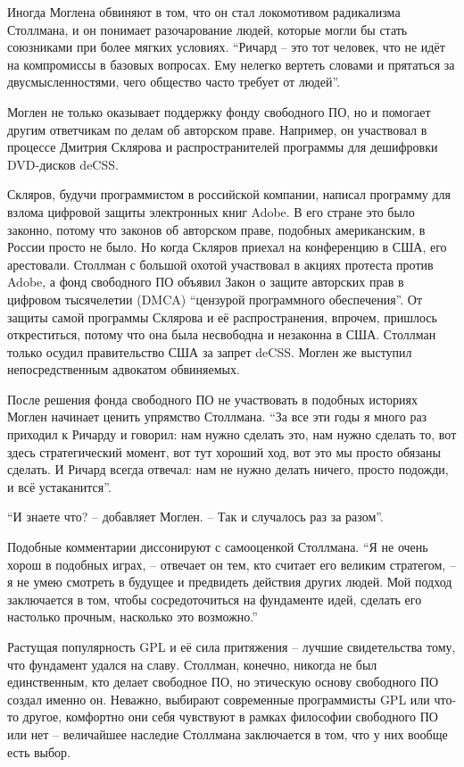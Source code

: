 Иногда Моглена обвиняют в том, что он стал локомотивом радикализма Столлмана, и он понимает разочарование людей, которые могли бы стать союзниками при более мягких условиях. \enquote{Ричард -- это тот человек, что не идёт на компромиссы в базовых вопросах. Ему нелегко вертеть словами и прятаться за двусмысленностями, чего общество часто требует от людей}.

Моглен не только оказывает поддержку фонду свободного ПО, но и помогает другим ответчикам по делам об авторском праве. Например, он участвовал в процессе Дмитрия Склярова и распространителей программы для дешифровки DVD-дисков deCSS.

Скляров, будучи программистом в российской компании, написал программу для взлома цифровой защиты электронных книг Adobe. В его стране это было законно, потому что законов об авторском праве, подобных американским, в России просто не было. Но когда Скляров приехал на конференцию в США, его арестовали. Столлман с большой охотой участвовал в акциях протеста против Adobe, а фонд свободного ПО объявил Закон о защите авторских прав в цифровом тысячелетии (DMCA) \enquote{цензурой программного обеспечения}. От защиты самой программы Склярова и её распространения, впрочем, пришлось откреститься, потому что она была несвободна и незаконна в США. Столлман только осудил правительство США за запрет deCSS. Моглен же выступил непосредственным адвокатом обвиняемых.

После решения фонда свободного ПО не участвовать в подобных историях Моглен начинает ценить упрямство Столлмана. \enquote{За все эти годы я много раз приходил к Ричарду и говорил: нам нужно сделать это, нам нужно сделать то, вот здесь стратегический момент, вот тут хороший ход, вот это мы просто обязаны сделать. И Ричард всегда отвечал: нам не нужно делать ничего, просто подожди, и всё устаканится}.

\enquote{И знаете что? -- добавляет Моглен. -- Так и случалось раз за разом}.

Подобные комментарии диссонируют с самооценкой Столлмана. \enquote{Я не очень хорош в подобных играх, -- отвечает он тем, кто считает его великим стратегом, -- я не умею смотреть в будущее и предвидеть действия других людей. Мой подход заключается в том, чтобы сосредоточиться на фундаменте идей, сделать его настолько прочным, насколько это возможно.\hspace{0.01in}}

Растущая популярность GPL и её сила притяжения -- лучшие свидетельства тому, что фундамент удался на славу. Столлман, конечно, никогда не был единственным, кто делает свободное ПО, но этическую основу свободного ПО создал именно он. Неважно, выбирают современные программисты GPL или что-то другое, комфортно они себя чувствуют в рамках философии свободного ПО или нет -- величайшее наследие Столлмана заключается в том, что у них вообще есть выбор.

